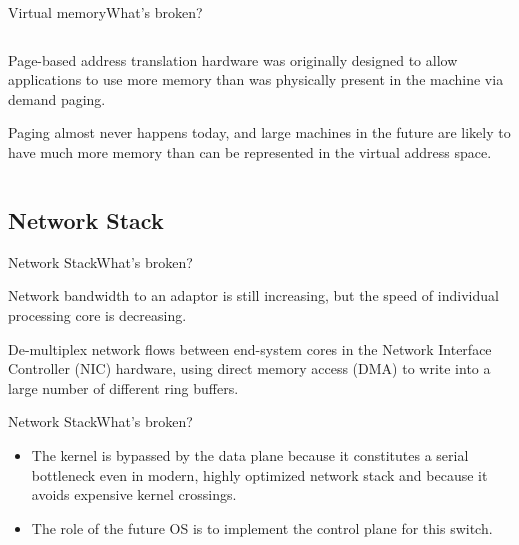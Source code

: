 \documentclass[10pt]{beamer}
\begin{document}
\begin{frame}{Virtual memory}{What's broken?}
\begin{columns}[T]
    \hfill
    \begin{column}{.8\textwidth}
      \begin{block}{}
        Page-based address translation hardware was originally designed to
        allow applications to use more memory than was physically present in
        the machine via demand paging.
      \end{block}\pause

      \begin{block}{}
        Paging almost never happens today, and large machines in the future
        are likely to have much more memory than can be represented in the
        virtual address space.
      \end{block}
    \end{column}
  \end{columns}
\end{frame}

\subsection{Network Stack}
\begin{frame}{Network Stack}{What's broken?}
  \begin{block}{}
    Network bandwidth to an adaptor is still increasing, but the speed of
    individual processing core is decreasing. \pause
  \end{block}

  \begin{block}{}
    De-multiplex network flows between end-system cores in the Network
    Interface Controller (NIC) hardware, using direct memory access (DMA) to write
    into a large number of different ring buffers.
  \end{block}

\end{frame}

\begin{frame}{Network Stack}{What's broken?}
  \begin{itemize}
    \item The kernel is bypassed by the data plane because it constitutes a
          serial bottleneck even in modern, highly optimized network stack
          and because it avoids expensive kernel crossings.\pause
    \item The role of the future OS is to implement the control plane for this
          switch.
  \end{itemize}
\end{frame}
\end{document}
